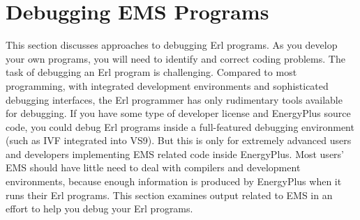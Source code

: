 \chapter{Debugging EMS Programs}\label{debugging-ems-programs}

This section discusses approaches to debugging Erl programs. As you develop your own programs, you will need to identify and correct coding problems. The task of debugging an Erl program is challenging. Compared to most programming, with integrated development environments and sophisticated debugging interfaces, the Erl programmer has only rudimentary tools available for debugging. If you have some type of developer license and EnergyPlus source code, you could debug Erl programs inside a full-featured debugging environment (such as IVF integrated into VS9). But this is only for extremely advanced users and developers implementing EMS related code inside EnergyPlus. Most users' EMS should have little need to deal with compilers and development environments, because enough information is produced by EnergyPlus when it runs their Erl programs. This section examines output related to EMS in an effort to help you debug your Erl programs.
